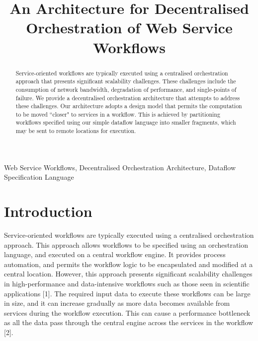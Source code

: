 \documentclass[10pt, conference, compsocconf]{IEEEtran}
\begin{document}
\title{An Architecture for Decentralised Orchestration of Web Service Workflows}





\author{
}


\maketitle

\begin{abstract}

Service-oriented workflows are typically executed using a centralised orchestration approach that presents significant scalability challenges. These challenges include the consumption of network bandwidth, degradation of performance, and single-points of failure. We provide a decentralised orchestration architecture that attempts to address these challenges. Our architecture adopts a design model that permits the computation to be moved ``closer" to services in a workflow. This is achieved by partitioning workflows specified using our simple dataflow language into smaller fragments, which may be sent to remote locations for execution.

\end{abstract}

\begin{IEEEkeywords}
Web Service Workflows,
Decentralised Orchestration Architecture, Dataflow Specification Language
\end{IEEEkeywords}


\IEEEpeerreviewmaketitle



\section{Introduction}
Service-oriented workflows are typically executed using a centralised orchestration approach. This approach allows workflows to be specified using an orchestration language, and executed on a central workflow engine. It provides process automation, and permits the workflow logic to be encapsulated and modified at a central location. However, this approach presents significant scalability challenges in high-performance and data-intensive workflows such as those seen in scientific applications [1]. The required input data to execute these workflows can be large in size, and it can increase gradually as more data becomes available from services during the workflow execution. This can cause a performance bottleneck as all the data pass through the central engine across the services in the workflow [2].\\
\end{document}
